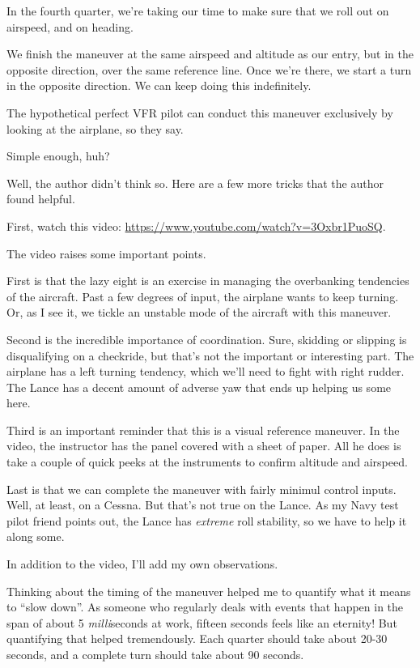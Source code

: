 In the fourth quarter, we're taking our time to make sure that we roll out on airspeed, and on heading.

We finish the maneuver at the same airspeed and altitude as our entry, but in the opposite direction, over the same reference line. Once we're there, we start a turn in the opposite direction. We can keep doing this indefinitely.

The hypothetical perfect VFR pilot can conduct this maneuver exclusively by looking at the airplane, so they say.

Simple enough, huh?

Well, the author didn't think so. Here are a few more tricks that the author found helpful.

First, watch this video: \url{https://www.youtube.com/watch?v=3Oxbr1PuoSQ}.

The video raises some important points.

First is that the lazy eight is an exercise in managing the overbanking tendencies of the aircraft. Past a few degrees of input, the airplane wants to keep turning. Or, as I see it, we tickle an unstable mode of the aircraft with this maneuver.

Second is the incredible importance of coordination. Sure, skidding or slipping is disqualifying on a checkride, but that's not the important or interesting part. The airplane has a left turning tendency, which we'll need to fight with right rudder. The Lance has a decent amount of adverse yaw that ends up helping us some here.

Third is an important reminder that this is a visual reference maneuver. In the video, the instructor has the panel covered with a sheet of paper. All he does is take a couple of quick peeks at the instruments to confirm altitude and airspeed.

Last is that we can complete the maneuver with fairly minimul control inputs. Well, at least, on a Cessna. But that's not true on the Lance. As my Navy test pilot friend points out, the Lance has \emph{extreme} roll stability, so we have to help it along some.

In addition to the video, I'll add my own observations.

Thinking about the timing of the maneuver helped me to quantify what it means to ``slow down''. As someone who regularly deals with events that happen in the span of about 5 \emph{milli}seconds at work, fifteen seconds feels like an eternity! But quantifying that helped tremendously. Each quarter should take about 20-30 seconds, and a complete turn should take about 90 seconds.

